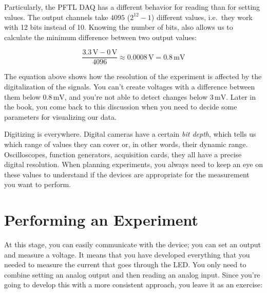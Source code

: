 Particularly, the {PFTL DAQ} has a different behavior for reading than for setting values. The output channels take $4095$ ($2^{12}-1$) different values, i.e.\ they work with 12 bits instead of 10. Knowing the number of bits, also allows us to calculate the minimum difference between two output values:

\begin{equation}
 \frac{3.3\,\textrm{V} - 0\,\textrm{V}}{4096} \approx 0.0008\,\textrm{V} = 0.8\,\textrm{mV}
\end{equation}

The equation above shows how the resolution of the experiment is affected by the digitalization of the signals. You can't create voltages with a difference between them below $0.8\,\textrm{mV}$, and you're not able to detect changes below $3\,\textrm{mV}$. Later in the book, you come back to this discussion when you need to decide some parameters for visualizing our data.

Digitizing is everywhere. Digital cameras have a certain \emph{bit depth}, which tells us which range of values they can cover or, in other words, their dynamic range. Oscilloscopes, function generators, acquisition cards, they all have a precise digital resolution. When planning experiments, you always need to keep an eye on these values to understand if the devices are appropriate for the measurement you want to perform.


\section{Performing an Experiment}\label{sec:doing-an-experiment}
At this stage, you can easily communicate with the device; you can set an output and measure a voltage. It means that you have developed everything that you needed to measure the current that goes through the LED. You only need to combine setting an analog output and then reading an analog input. Since you're going to develop this with a more consistent approach, you leave it as an exercise:


